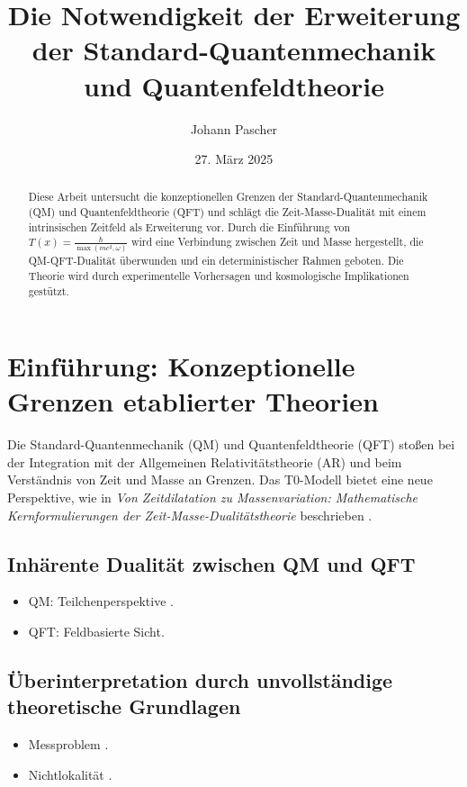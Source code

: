 \documentclass{article}
\title{Die Notwendigkeit der Erweiterung der Standard-Quantenmechanik und Quantenfeldtheorie}
\author{Johann Pascher}
\date{27. März 2025}
\newcommand{\Tfield}{T(x)}
\begin{document}
	
	\maketitle
	
	\begin{abstract}
		Diese Arbeit untersucht die konzeptionellen Grenzen der Standard-Quantenmechanik (QM) und Quantenfeldtheorie (QFT) und schlägt die Zeit-Masse-Dualität mit einem intrinsischen Zeitfeld als Erweiterung vor. Durch die Einführung von \(\Tfield = \frac{\hbar}{\max(m c^2, \omega)}\) wird eine Verbindung zwischen Zeit und Masse hergestellt, die QM-QFT-Dualität überwunden und ein deterministischer Rahmen geboten. Die Theorie wird durch experimentelle Vorhersagen und kosmologische Implikationen gestützt.
	\end{abstract}
	
	\tableofcontents
	\newpage
	
	\section{Einführung: Konzeptionelle Grenzen etablierter Theorien}
	Die Standard-Quantenmechanik (QM) und Quantenfeldtheorie (QFT) stoßen bei der Integration mit der Allgemeinen Relativitätstheorie (AR) und beim Verständnis von Zeit und Masse an Grenzen. Das T0-Modell bietet eine neue Perspektive, wie in \textit{Von Zeitdilatation zu Massenvariation: Mathematische Kernformulierungen der Zeit-Masse-Dualitätstheorie} beschrieben \cite{pascher_lagrange_2025}.
	
	\subsection{Inhärente Dualität zwischen QM und QFT}
	\begin{itemize}
		\item QM: Teilchenperspektive \cite{schrodinger}.
		\item QFT: Feldbasierte Sicht.
	\end{itemize}
	
	\subsection{Überinterpretation durch unvollständige theoretische Grundlagen}
	\begin{itemize}
		\item Messproblem \cite{einstein2}.
		\item Nichtlokalität \cite{bell}.
	\end{itemize}
	
\end{document}
